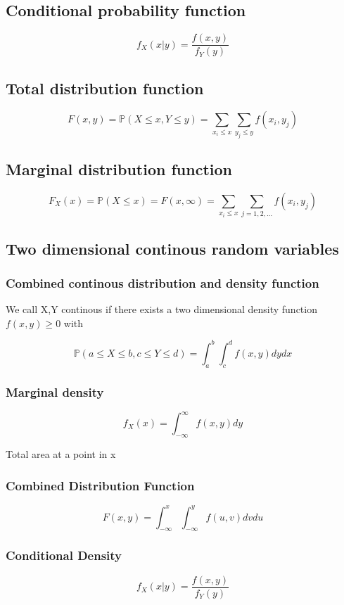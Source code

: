 \documentclass{article}
\begin{document}
\subsection{Conditional probability function}

\[f_X(x|y) = \frac{f(x,y)}{f_Y(y)}\]


\subsection{Total distribution function}

\[F(x,y) = \mathbb{P}( X \leq x, Y \leq y) = \sum_{x_i \leq x}\sum_{y_j \leq y}f(x_i,y_j)\]

\subsection{Marginal distribution function}

\[F_X(x) = \mathbb{P}(X \leq x) = F(x,\infty) = \sum_{x_i \leq x}\sum_{j = 1,2,...}f(x_i,y_j)\]

\subsection{Two dimensional continous random variables}

\subsubsection{Combined continous distribution and density function}

We call X,Y continous if there exists a two dimensional density function $f(x,y) \geq 0$ with

\[\mathbb{P}(a \leq X \leq b , c \leq Y \leq d) = \int_{a}^b\int_c^df(x,y)dy dx\]

\subsubsection{Marginal density}
\[f_X(x) = \int_{-\infty}^{\infty}f(x,y)dy\]

Total area at a point in x

\subsubsection{Combined Distribution Function}
\[F(x,y) = \int_{-\infty}^{x}\int_{-\infty}^{y}f(u,v)dvdu\]

\subsubsection{Conditional Density}
\[f_X(x|y) = \frac{f(x,y)}{f_Y(y)}\]
\end{document}
